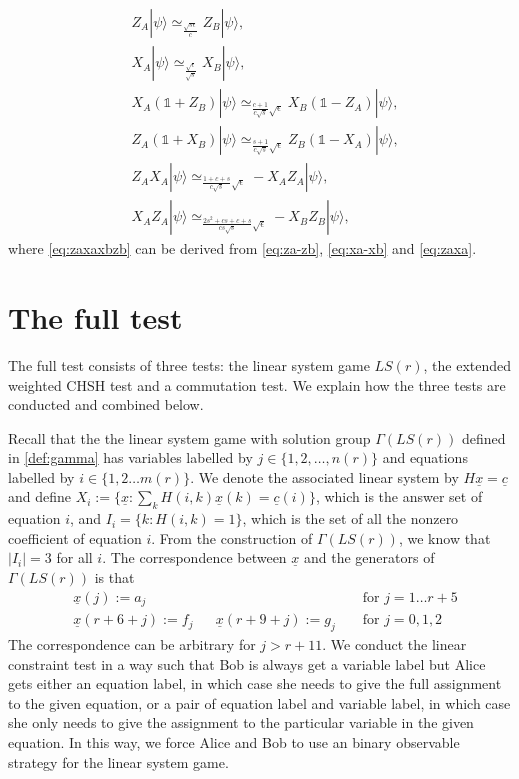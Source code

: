 \documentclass[11pt,letterpaper]{article}
\newcommand{\ket}[1]{|#1\rangle}
\newcommand{\1}{\mathbb{1}}
\newcommand{\LS}{LS}
\newcommand{\nr}{n(r)}
\newcommand{\mr}{m(r)}
\newcommand{\ux}{\underline{x}}
\newcommand{\uc}{\underline{c}}
\newcommand{\se}{\sqrt{\epsilon}}
\newcommand{\appd}[1]{\simeq_{#1}}
\theoremstyle{definition}
\begin{document}
\begin{align}
	\label{eq:za-zb}& Z_A\ket{\psi} \appd{\frac{\sqrt{s\epsilon}}{c}} Z_B\ket{\psi},\\
	\label{eq:xa-xb}&X_A\ket{\psi} \appd{\frac{\sqrt{\epsilon}}{\sqrt{s}}} X_B \ket{\psi}, \\
	\label{eq:xazb}&X_A(\1+Z_B)\ket{\psi} \appd{\frac{c+1}{c\sqrt{s}} \se} X_B(\1-Z_A) \ket{\psi},\\
	\label{eq:zaxb}&Z_A(\1+X_B)\ket{\psi} \appd{ \frac{s+1}{c\sqrt{s}} \se} Z_B(\1-X_A) \ket{\psi},\\
	\label{eq:zaxa}&Z_AX_A\ket{\psi} \appd{\frac{1+c+s}{c\sqrt{s}} \se} -X_AZ_A \ket{\psi},\\
	\label{eq:zaxaxbzb}&X_AZ_A \ket{\psi} \appd{\frac{2s^2+cs+c+s}{cs\sqrt{s}} \sqrt{\epsilon}} -X_BZ_B \ket{\psi},
\end{align}
where \cref{eq:zaxaxbzb} can be derived from \cref{eq:za-zb}, \cref{eq:xa-xb} and \cref{eq:zaxa}.
\section{The full test}
\label{sec:full_test}
The full test consists of three tests: the linear system game $\LS(r)$,
the extended weighted CHSH test and a commutation test. We explain how the three tests are conducted and
combined below.

Recall that the the linear system game with solution group $\Gamma(\LS(r))$ defined in \cref{def:gamma} has variables labelled by $j \in \{1,2,\dots,\nr\}$ and
equations labelled by $i \in \{1, 2 \dots \mr\}$.
We denote the associated linear system by $H\ux = \uc$ and
define $X_i := \{ \ux : \sum_{k} H(i,k)\ux(k) = \uc(i) \}$, which is the answer set of equation $i$,
and $I_i = \{ k : H(i,k) = 1\}$, which is the set of all the nonzero coefficient of equation $i$.
From the construction of $\Gamma(\LS(r))$, we know that $| I_i| = 3$ for all $i$.
The correspondence between $\ux$ and the generators of $\Gamma(\LS(r))$ is that
\begin{align*}
	&\ux(j) := a_j &&&&\text{ for } j = 1 \dots r+5 \\
	&\ux(r+6+j) := f_j&& \ux(r+9+j) := g_j &&\text{ for } j = 0,1,2 
\end{align*} 
The correspondence can be arbitrary for $j > r+11$.
We conduct the linear constraint test in a way such that Bob is always get a variable label
but Alice gets either an equation label, in which case she needs to give the full assignment to the given equation,
or a pair of equation label and variable label, in which case she only needs to give the assignment to the particular 
variable in the given equation. In this way, we force Alice and Bob to use an binary observable strategy 
for the linear system game. 
\end{document}
